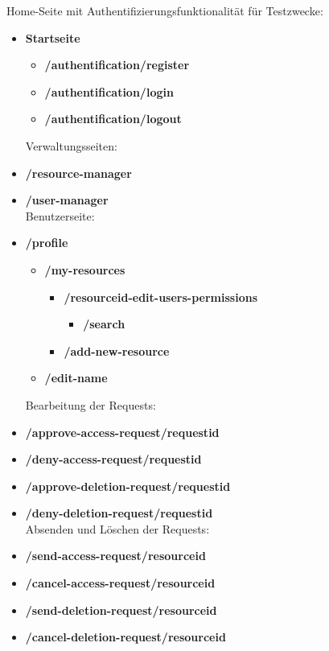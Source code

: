 \documentclass[parskip=full,11pt]{scrartcl}
\begin{document}
\indent Home-Seite mit Authentifizierungsfunktionalität für Testzwecke:
\begin{itemize}[itemsep=0pt]
\item \textbf{Startseite}
	\begin{itemize}[itemsep=0pt]
	\item \textbf{/authentification/register}
	\item \textbf{/authentification/login}
	\item \textbf{/authentification/logout}\\
	\end{itemize}

\noindent Verwaltungsseiten:
\item \textbf{/resource-manager}
\item \textbf{/user-manager}\\

\noindent Benutzerseite:
\item \textbf{/profile}
	\begin{itemize}[itemsep=0pt]
	\item \textbf{/my-resources}
		\begin{itemize}
		\item \textbf{/resourceid-edit-users-permissions}
			\begin{itemize}
			\item \textbf{/search}
			\end{itemize}
		\item \textbf{/add-new-resource}		
		\end{itemize}
	\item \textbf{/edit-name}\\
	\end{itemize}
\newpage
\noindent Bearbeitung der Requests:
\item \textbf{/approve-access-request/requestid}
\item \textbf{/deny-access-request/requestid}
\item \textbf{/approve-deletion-request/requestid}
\item \textbf{/deny-deletion-request/requestid}\\

\noindent Absenden und Löschen der Requests:
\item \textbf{/send-access-request/resourceid}
\item \textbf{/cancel-access-request/resourceid}
\item \textbf{/send-deletion-request/resourceid}
\item \textbf{/cancel-deletion-request/resourceid}\\


\end{itemize}
\end{document}
